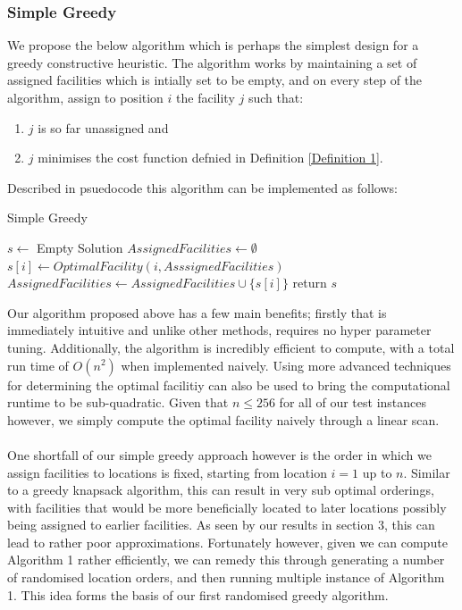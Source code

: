 \documentclass[a4paper,10pt]{article}
\begin{document}
\subsubsection*{Simple Greedy}
We propose the below algorithm which is perhaps the simplest design for a greedy constructive heuristic. The algorithm works by maintaining a set of assigned facilities which is intially set to be empty, and on every step of the algorithm, assign to position $i$ the facility $j$ such that: 
\begin{enumerate}
    \item $j$ is so far unassigned and
    \item $j$ minimises the cost function defnied in  Definition \ref{Definition 1}.
\end{enumerate}
Described in psuedocode this algorithm can be implemented as follows: 

\begin{algorithm}
\caption{Simple Greedy}\label{alg:cap}
\begin{algorithmic}
\State $s \gets $ Empty Solution
\State $Assigned Facilities \gets \emptyset$
    \State $s[i] \gets OptimalFacility(i, AsssignedFacilities)$
    \State $AssignedFacilities \gets AssignedFacilities \cup \{s[i]\}$
\EndFor
\State return $s$
\end{algorithmic}
\end{algorithm}

Our algorithm proposed above has a few main benefits; firstly that is immediately intuitive and unlike other methods, requires no hyper parameter tuning. Additionally, the algorithm is incredibly efficient to compute, with a total run time of $O(n^2)$ when implemented naively. Using more advanced techniques for determining the optimal facilitiy \cite{KHULLER199534} can also be used to bring the computational runtime to be sub-quadratic. Given that $n\leq 256$ for all of our test instances however, we simply compute the optimal facility naively through a linear scan. \\
\\
One shortfall of our simple greedy approach however is the order in which we assign facilities to locations is fixed, starting from location $i=1$ up to $n$. Similar to a greedy knapsack algorithm, this can result in very sub optimal orderings, with facilities that would be more beneficially located to later locations possibly being assigned to earlier facilities. As seen by our results in section 3, this can lead to rather poor approximations. Fortunately however, given we can compute Algorithm 1 rather efficiently, we can remedy this through generating a number of randomised location orders, and then running multiple instance of Algorithm 1. This idea forms the basis of our first randomised greedy algorithm.
\end{document}
